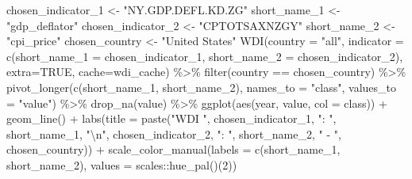 \documentclass[
]{bxjsbook}
\newenvironment{Shaded}{\begin{snugshade}}{\end{snugshade}}
\newcommand{\AttributeTok}[1]{\textcolor[rgb]{0.77,0.63,0.00}{#1}}
\newcommand{\ConstantTok}[1]{\textcolor[rgb]{0.00,0.00,0.00}{#1}}
\newcommand{\DecValTok}[1]{\textcolor[rgb]{0.00,0.00,0.81}{#1}}
\newcommand{\FunctionTok}[1]{\textcolor[rgb]{0.00,0.00,0.00}{#1}}
\newcommand{\NormalTok}[1]{#1}
\newcommand{\OtherTok}[1]{\textcolor[rgb]{0.56,0.35,0.01}{#1}}
\newcommand{\SpecialCharTok}[1]{\textcolor[rgb]{0.00,0.00,0.00}{#1}}
\newcommand{\StringTok}[1]{\textcolor[rgb]{0.31,0.60,0.02}{#1}}
\theoremstyle{definition}
\theoremstyle{definition}
\theoremstyle{definition}
\theoremstyle{definition}
\theoremstyle{remark}
\begin{document}
\begin{Shaded}
\begin{Highlighting}[]
\NormalTok{chosen\_indicator\_1 }\OtherTok{\textless{}{-}} \StringTok{"NY.GDP.DEFL.KD.ZG"}
\NormalTok{short\_name\_1 }\OtherTok{\textless{}{-}} \StringTok{"gdp\_deflator"}
\NormalTok{chosen\_indicator\_2 }\OtherTok{\textless{}{-}} \StringTok{"CPTOTSAXNZGY"}
\NormalTok{short\_name\_2 }\OtherTok{\textless{}{-}} \StringTok{"cpi\_price"}
\NormalTok{chosen\_country }\OtherTok{\textless{}{-}} \StringTok{"United States"}
\FunctionTok{WDI}\NormalTok{(}\AttributeTok{country =} \StringTok{"all"}\NormalTok{, }\AttributeTok{indicator =} \FunctionTok{c}\NormalTok{(}\AttributeTok{short\_name\_1 =}\NormalTok{ chosen\_indicator\_1, }\AttributeTok{short\_name\_2 =}\NormalTok{ chosen\_indicator\_2), }\AttributeTok{extra=}\ConstantTok{TRUE}\NormalTok{, }\AttributeTok{cache=}\NormalTok{wdi\_cache) }\SpecialCharTok{\%\textgreater{}\%} 
  \FunctionTok{filter}\NormalTok{(country }\SpecialCharTok{==}\NormalTok{ chosen\_country) }\SpecialCharTok{\%\textgreater{}\%} 
  \FunctionTok{pivot\_longer}\NormalTok{(}\FunctionTok{c}\NormalTok{(short\_name\_1, short\_name\_2), }\AttributeTok{names\_to =} \StringTok{"class"}\NormalTok{, }\AttributeTok{values\_to =} \StringTok{"value"}\NormalTok{) }\SpecialCharTok{\%\textgreater{}\%} \FunctionTok{drop\_na}\NormalTok{(value) }\SpecialCharTok{\%\textgreater{}\%}
  \FunctionTok{ggplot}\NormalTok{(}\FunctionTok{aes}\NormalTok{(year, value, }\AttributeTok{col =}\NormalTok{ class)) }\SpecialCharTok{+} \FunctionTok{geom\_line}\NormalTok{() }\SpecialCharTok{+}
  \FunctionTok{labs}\NormalTok{(}\AttributeTok{title =} \FunctionTok{paste}\NormalTok{(}\StringTok{"WDI "}\NormalTok{, chosen\_indicator\_1, }\StringTok{": "}\NormalTok{, short\_name\_1, }\StringTok{"}\SpecialCharTok{\textbackslash{}n}\StringTok{"}\NormalTok{, chosen\_indicator\_2, }\StringTok{": "}\NormalTok{, short\_name\_2, }\StringTok{" {-} "}\NormalTok{, chosen\_country)) }\SpecialCharTok{+}
  \FunctionTok{scale\_color\_manual}\NormalTok{(}\AttributeTok{labels =} \FunctionTok{c}\NormalTok{(short\_name\_1, short\_name\_2), }\AttributeTok{values =}\NormalTok{ scales}\SpecialCharTok{::}\FunctionTok{hue\_pal}\NormalTok{()(}\DecValTok{2}\NormalTok{))}
\end{Highlighting}
\end{Shaded}
\end{document}
